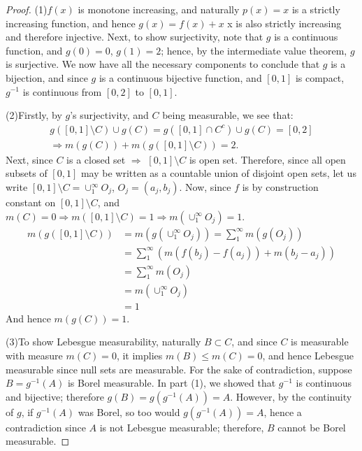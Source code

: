 \begin{proof}
    (1)$f(x)$ is monotone increasing, and naturally $p(x)=x$
    is a strictly increasing function, and hence $g(x)=f(x)+x$
    x is also strictly increasing and therefore injective. 
    Next, to show surjectivity, note that $g$ is a continuous function, 
    and $g(0)=0$, $g(1)=2$; hence, by the intermediate value theorem, 
    $g$ is surjective. We now have all the necessary components to 
    conclude that $g$ is a bijection, and since $g$ is a
    continuous bijective function, and $[0,1]$ is compact, 
    $g^{-1}$ is continuous from $[0,2]$ to $[0,1]$.

    (2)Firstly, by $g$'s surjectivity, and $C$ being measurable, 
    we see that:
    \begin{displaymath}
        \begin{array}{rl}
            g([0,1]\setminus C)\cup g(C)=g([0,1]\cap C^c)\cup g(C)=[0,2]\\
            \Rightarrow m(g(C))+m(g([0,1]\setminus C))=2.
        \end{array}
    \end{displaymath}
    Next, since $C$ is a closed set $\Rightarrow$ $[0,1]\setminus C$
    is open set. Therefore, since all open subsets of $[0,1]$ may
    be written as a countable union of disjoint open sets, 
    let us write $[0,1]\setminus C=\cup_{1}^{\infty}O_j$, $O_j=(a_j,b_j)$.
    Now, since $f$ is by construction constant on $[0,1]\setminus C$,
    and $m(C)=0\Rightarrow m([0,1]\setminus C)=1\Rightarrow
    m(\cup_{1}^{\infty}O_j)=1$.
    \begin{displaymath}
        \begin{array}{rl}
            m(g([0,1]\setminus C))&=m(g(\cup_{1}^{\infty}O_j))
            =\sum_{1}^{\infty}m(g(O_j))\\
            &=\sum_{1}^{\infty}(m(f(b_j)-f(a_j))+m(b_j-a_j))\\
            &=\sum_{1}^{\infty}m(O_j)\\
            &=m(\cup_{1}^{\infty}O_j)\\
            &=1
        \end{array}
    \end{displaymath}  
    And hence $m(g(C))=1$.
    
    (3)To show Lebesgue measurability, naturally $B\subset C$,
    and since $C$ is measurable with measure $m(C)=0$, it implies
    $m(B)\leq m(C)=0$, and hence Lebesgue measurable since null 
    sets are measurable. For the sake of contradiction, suppose
    $B=g^{-1}(A)$ is Borel measurable. In part (1), we showed that
    $g^{-1}$ is continuous and bijective; therefore 
    $g(B)=g(g^{-1}(A))=A$. However, by the continuity of $g$,
    if $g^{-1}(A)$ was Borel, so too would $g(g^{-1}(A))=A$,
    hence a contradiction since $A$ is not Lebesgue
    measurable; therefore, $B$ cannot be Borel measurable.


\end{proof}
